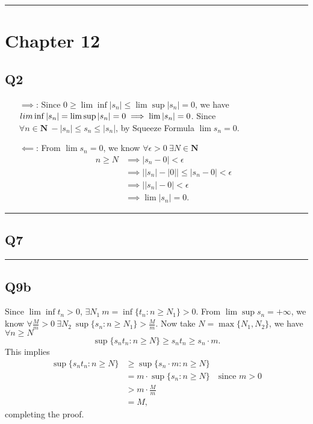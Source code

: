 \documentclass[12pt, lettersize]{article}
\newcommand{\N}{\mathbf{N}}
\newcommand{\lline}{\noindent\rule{\textwidth}{1pt}}
\begin{document}
	\lline
	
	\section*{Chapter 12}
	\subsection*{Q2}
	\begin{itemize}
		\item[]
		\item[$\implies$:] Since $0\geq\lim\inf|s_n|\leq\lim\sup|s_n|=0$, we have $\\lim\inf|s_n|=\lim\sup|s_n|=0\implies \lim|s_n|=0$. Since $\forall n\in\N\ -|s_n|\leq s_n\leq|s_n|$, by Squeeze Formula $\lim s_n=0$.
		\item[$\impliedby$:] From $\lim s_n=0$, we know $\forall\epsilon>0\ \exists N\in\N$
		\begin{align*}
			n\geq N &\implies |s_n-0|<\epsilon\\
					&\implies \big||s_n|-|0|\big|\leq|s_n-0|<\epsilon\\
					&\implies \big||s_n|-0\big|<\epsilon\\
					&\implies \lim|s_n|=0.
		\end{align*}
	\end{itemize}
	
	\lline
	
	\subsection*{Q7}
	
	\lline
	
	\subsection*{Q9b}
	Since $\lim\inf t_n>0$, $\exists N_1\ m=\inf\{t_n: n\geq N_1\}>0$. From $\lim\sup s_n=+\infty$, we know $\forall \frac{M}{m}>0\ \exists N_2\ \sup\{s_n: n\geq N_1\}>\frac{M}{m}$. Now take $N=\max\{N_1,N_2\}$, we have $\forall n\geq N$
	\begin{displaymath}
		\sup\{s_nt_n: n\geq N\} \geq s_nt_n\geq s_n\cdot m.						
	\end{displaymath}
	This implies 
	\begin{align*}
		\sup\{s_nt_n: n\geq N\} &\geq \sup\{s_n\cdot m: n\geq N\}\\
								&=m\cdot\sup\{s_n: n\geq N\}\quad\text{since $m>0$}\\
								&>m\cdot\frac{M}{m}\\
								&=M,
	\end{align*}
	completing the proof.
	
\end{document}
